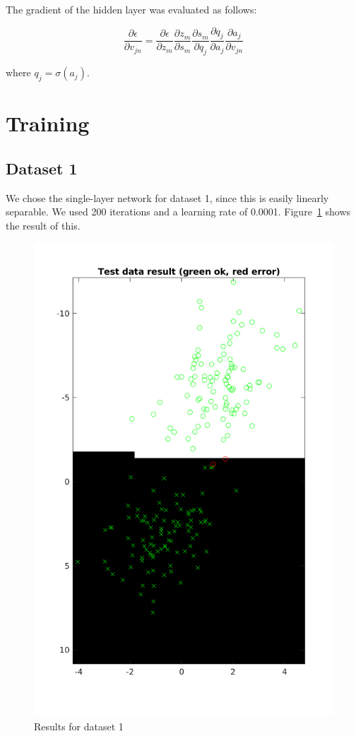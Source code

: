 \documentclass{article}
\begin{document}
The gradient of the hidden layer was evaluated as follows:

\begin{equation}
  \frac{\partial \epsilon}{\partial v_{jn}} =
  \frac{\partial \epsilon}{\partial z_m}
  \frac{\partial z_m}{\partial s_m}
  \frac{\partial s_m}{\partial q_j}
  \frac{\partial q_j}{\partial a_j}
  \frac{\partial a_j}{\partial v_{jn}}
\end{equation}

where $q_j = \sigma(a_j)$.

\section{Training}

\subsection{Dataset 1}

We chose the single-layer network for dataset 1, since this 
is easily linearly separable. We used 200 iterations and a learning rate of
0.0001. Figure~\ref{fig:res1} shows the result of this.

\begin{figure}
    \includegraphics[width=13cm]{dataset1res.png}
    \caption{Results for dataset 1}
    \label{fig:res1}
\end{figure}
\end{document}
